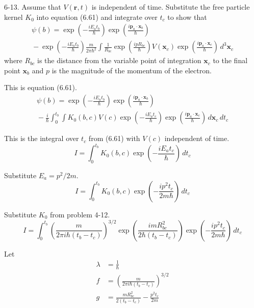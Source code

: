 \documentclass[12pt]{article}
\begin{document}
6-13.
Assume that $V(\mathbf r,t)$ is independent of time.
Substitute the free particle kernel $K_0$ into equation
(6.61) and integrate over $t_c$ to show that
\begin{multline*}
\psi(b)=
\exp\left(-\frac{iE_at_b}{\hbar}\right)
\exp\left(\frac{i\mathbf p_a\cdot\mathbf x_b}{\hbar}\right)
\\
{}-\exp\left(-\frac{iE_at_b}{\hbar}\right)
\frac{m}{2\pi\hbar^2}
\int
\frac{1}{R_{bc}}
\exp\left(\frac{ipR_{bc}}{\hbar}\right)
V(\mathbf x_c)
\exp\left(\frac{i\mathbf p_a\cdot\mathbf x_c}{\hbar}\right)
\,d^3\mathbf x_c
\tag{6.62}
\end{multline*}
where $R_{bc}$ is the distance from the variable point of integration
$\mathbf x_c$ to the final point $\mathbf x_b$ and $p$ is the
magnitude of the momentum of the electron.

\bigskip
This is equation (6.61).
\begin{multline*}
\psi(b)=
\exp\left(-\frac{iE_at_b}{\hbar}\right)
\exp\left(\frac{i\mathbf p_a\cdot\mathbf x_b}{\hbar}\right)
\\
{}-\frac{i}{\hbar}\int_0^{t_b}\int
K_0(b,c)V(c)
\exp\left(-\frac{iE_at_c}{\hbar}\right)
\exp\left(\frac{i\mathbf p_a\cdot\mathbf x_c}{\hbar}\right)
\,d\mathbf x_c\,dt_c
\tag{6.61}
\end{multline*}

This is the integral over $t_c$ from (6.61) with $V(c)$ independent of time.
\begin{equation*}
I=\int_0^{t_b}K_0(b,c)
\exp\left(-\frac{iE_at_c}{\hbar}\right)
\,dt_c
\end{equation*}

Substitute $E_a=p^2/2m$.
\begin{equation*}
I=\int_0^{t_b}K_0(b,c)
\exp\left(-\frac{ip^2t_c}{2m\hbar}\right)
\,dt_c
\end{equation*}

Substitute $K_0$ from problem 4-12.
\begin{equation*}
I=\int_0^{t_b}
\left(\frac{m}{2\pi i\hbar(t_b-t_c)}\right)^{3/2}
\exp\left(\frac{imR_{bc}^2}{2\hbar(t_b-t_c)}\right)
\exp\left(-\frac{ip^2t_c}{2m\hbar}\right)
\,dt_c
\end{equation*}

Let
\begin{align*}
\lambda&=\frac{1}{\hbar}
\\
f&=\left(\frac{m}{2\pi i\hbar(t_b-t_c)}\right)^{3/2}
\\
g&=\frac{m R_{bc}^2}{2(t_b-t_c)}-\frac{p^2t_c}{2m}
\end{align*}
\end{document}
